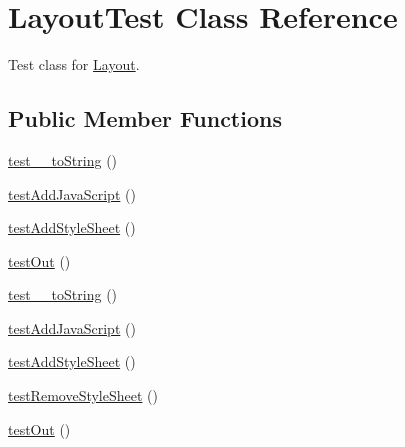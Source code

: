 \hypertarget{class_layout_test}{
\section{LayoutTest Class Reference}
\label{class_layout_test}
}


Test class for \hyperlink{class_layout}{Layout}.  


\subsection*{Public Member Functions}
\begin{DoxyCompactItemize}
\item 
\hyperlink{class_layout_test_ab41634e8d0397334e71f409626fc60fc}{test\_\-\_\-toString} ()
\item 
\hyperlink{class_layout_test_a97e6be8c99105e4d625ce769f8b085f6}{testAddJavaScript} ()
\item 
\hyperlink{class_layout_test_a29b2b3ffe02987ea2e2ce21f76d78017}{testAddStyleSheet} ()
\item 
\hyperlink{class_layout_test_a67660aeb09b1e64607050a3ad183486d}{testOut} ()
\item 
\hyperlink{class_layout_test_ab41634e8d0397334e71f409626fc60fc}{test\_\-\_\-toString} ()
\item 
\hyperlink{class_layout_test_a97e6be8c99105e4d625ce769f8b085f6}{testAddJavaScript} ()
\item 
\hyperlink{class_layout_test_a29b2b3ffe02987ea2e2ce21f76d78017}{testAddStyleSheet} ()
\item 
\hyperlink{class_layout_test_a1bc55dddf6f3e6c99000f2c0b157671a}{testRemoveStyleSheet} ()
\item 
\hyperlink{class_layout_test_a67660aeb09b1e64607050a3ad183486d}{testOut} ()
\end{DoxyCompactItemize}
